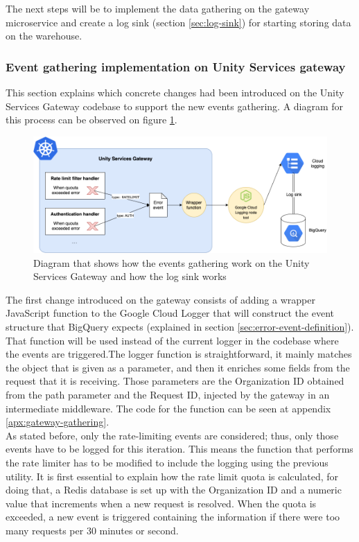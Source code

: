 \documentclass[english, 12pt, a4paper, sci, utf8, a-1b, online]{aaltothesis}
\begin{document}
The next steps will be to implement the data gathering on the gateway microservice and create a log sink (section \ref{sec:log-sink}) for starting storing data on the warehouse.

\subsubsection{Event gathering implementation on Unity Services gateway}
\label{sec:event-gathering}

This section explains which concrete changes had been introduced on the Unity Services Gateway codebase to support the new events gathering. A diagram for this process can be observed on figure \ref{fig:event-gathering}.\\

\begin{figure}[h!]
    \centering
    \includegraphics[scale=0.4]{src/thesis/img/technical-solution/events-gathering.png}
    \caption{Diagram that shows how the events gathering work on the Unity Services Gateway and how the log sink works}
    \label{fig:event-gathering}
\end{figure}

The first change introduced on the gateway consists of adding a wrapper JavaScript function to the Google Cloud Logger that will construct the event structure that BigQuery expects (explained in section \ref{sec:error-event-definition}). That function will be used instead of the current logger in the codebase where the events are triggered.The logger function is straightforward, it mainly matches the object that is given as a parameter, and then it enriches some fields from the request that it is receiving. Those parameters are the Organization ID obtained from the path parameter and the Request ID, injected by the gateway in an intermediate middleware. The code for the function can be seen at appendix \ref{apx:gateway-gathering}.\\

As stated before, only the rate-limiting events are considered; thus, only those events have to be logged for this iteration. This means the function that performs the rate limiter has to be modified to include the logging using the previous utility. It is first essential to explain how the rate limit quota is calculated, for doing that, a Redis database is set up with the Organization ID and a numeric value that increments when a new request is resolved. When the quota is exceeded, a new event is triggered containing the information if there were too many requests per 30 minutes or second.\\
\end{document}
